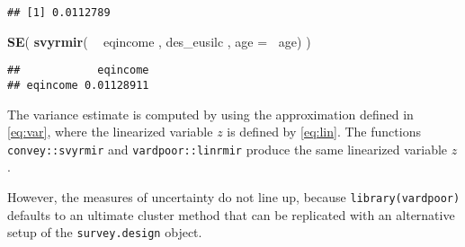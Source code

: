\documentclass[]{book}
\newenvironment{Shaded}{\begin{snugshade}}{\end{snugshade}}
\newcommand{\DataTypeTok}[1]{\textcolor[rgb]{0.13,0.29,0.53}{#1}}
\newcommand{\KeywordTok}[1]{\textcolor[rgb]{0.13,0.29,0.53}{\textbf{#1}}}
\newcommand{\NormalTok}[1]{#1}
\newcommand{\OperatorTok}[1]{\textcolor[rgb]{0.81,0.36,0.00}{\textbf{#1}}}
\newcommand{\StringTok}[1]{\textcolor[rgb]{0.31,0.60,0.02}{#1}}
\begin{document}
\begin{verbatim}
## [1] 0.0112789
\end{verbatim}

\begin{Shaded}
\begin{Highlighting}[]
\KeywordTok{SE}\NormalTok{( }\KeywordTok{svyrmir}\NormalTok{( }\OperatorTok{~}\StringTok{ }\NormalTok{eqincome , des_eusilc , }\DataTypeTok{age =} \OperatorTok{~}\NormalTok{age) ) }
\end{Highlighting}
\end{Shaded}

\begin{verbatim}
##            eqincome
## eqincome 0.01128911
\end{verbatim}

The variance estimate is computed by using the approximation defined in \eqref{eq:var}, where the linearized variable \(z\) is defined by \eqref{eq:lin}. The functions \texttt{convey::svyrmir} and \texttt{vardpoor::linrmir} produce the same linearized variable \(z\).

However, the measures of uncertainty do not line up, because \texttt{library(vardpoor)} defaults to an ultimate cluster method that can be replicated with an alternative setup of the \texttt{survey.design} object.
\end{document}
